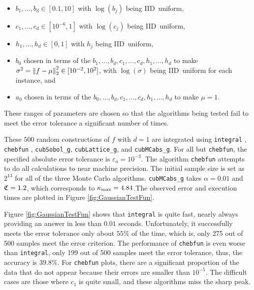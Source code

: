\documentclass{iitthesis}
\theoremstyle{definition}
\begin{document}
\begin{itemize} 
\item $b_1, \ldots, b_d \in [0.1,10]$ with $\log(b_j)$ being IID\ uniform,
\item $c_1, \ldots, c_d \in [10^{-6},1]$ with $\log(c_j)$ being IID\ uniform,
\item $h_1, \ldots, h_d \in [0,1]$ with $h_j$ being IID\ uniform,
\item $b_0$ chosen in terms of the $b_1, \ldots, b_d, c_1, \ldots, c_d, h_1, \ldots, h_d$ to make $\sigma^2 =\norm[2]{f-\mu}^2 \in [10^{-2}, 10^2]$, with $\log(\sigma)$ being IID\ uniform for each instance, and
\item $a_0$ chosen in terms of the $b_0, \ldots, b_d, c_1, \ldots, c_d, h_1, \ldots, h_d$ to make $\mu=1$.
\end{itemize}
These ranges of parameters are chosen so that the algorithms being tested fail to meet the error tolerance a significant number of times.

These $500$ random constructions of $f$ with $d=1$ are integrated using {\tt integral} \cite{Shampone08}, {\tt chebfun} \cite{Chebfun14}, {\tt cubSobol\_g}, {\tt cubLattice\_g}, and {\tt cubMCabs\_g}. For all but {\tt chebfun}, the specified absolute error tolerance is $\varepsilon_a=10^{-3}$. The algorithm {\tt chebfun} attempts to do all calculations to near machine precision. The initial sample size is set as $2^{13}$ for all of the three Monte Carlo algorithms. {\tt cubMCabs\_g} takes $\alpha=0.01$ and $\fudge = 1.2$, which corresponds to $\kmax =4.84$.The observed error and execution times are plotted in Figure \ref{fig:GaussianTestFun}.  

Figure \ref{fig:GaussianTestFun} shows that {\tt integral} is quite fast, nearly always providing an answer in less than $0.01$ seconds.  Unfortunately, it successfully meets the error tolerance only about $55\%$ of the time, which is, only 275 out of 500 samples meet the error criterion. The performance of {\tt chebfun} is even worse than {\tt integral}, only 199 out of 500 samples meet the error tolerance, thus, the accuracy is $39.8\%$. For {\tt chebfun} plots, there are a significant proportion of the data that do not appear because their errors are smaller than $10^{-5}$.  The difficult cases are those where $c_1$ is quite small, and these algorithms miss the sharp peak.
%
\end{document}
